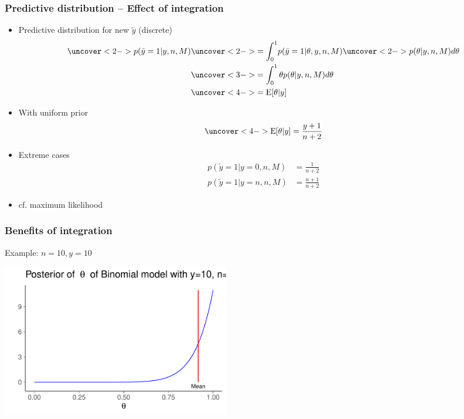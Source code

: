 \documentclass[10pt,handout]{beamer}
\begin{document}
\begin{frame}
  \frametitle{Predictive distribution -- Effect of integration}

  \begin{itemize}
  \item Predictive distribution for new $\tilde{y}$ (discrete)
    \begin{align*}
      \uncover<2->{p(\tilde{y}=1|y,n,M)} & \uncover<2->{= \int_0^1} p(\tilde{y}=1|\theta,y,n,M) \uncover<2->{p(\theta|y,n,M)d\theta}\\
      &\uncover<3->{= \int_0^1 \theta p(\theta|y,n,M)d\theta}\\
      &\uncover<4->{= \E[\theta|y]}
    \end{align*}
    \vskip -4mm
  \item<5-> With uniform prior
    \begin{align*}
      \uncover<4->{\E[\theta|y] = \frac{y+1}{n+2}}
    \end{align*}
  \item<6-> Extreme cases
    \begin{align*}
      p(\tilde{y}=1|y=0,n,M) &= \frac{1}{n+2} \\
      p(\tilde{y}=1|y=n,n,M) &= \frac{n+1}{n+2}
    \end{align*}
    \vskip -2mm

  \item<6-> cf. maximum likelihood

  \end{itemize}
\end{frame}

\begin{frame}
  \frametitle{Benefits of integration}

  Example: $n=10, y=10$
  \begin{center}
  \includegraphics[width=10cm]{figs/dbbeta10.pdf}
  \end{center}

\end{frame}
\end{document}
